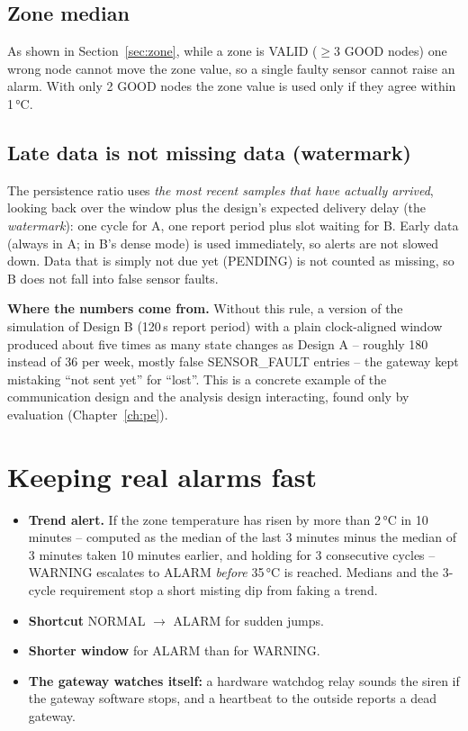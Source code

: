 \documentclass[11pt,a4paper]{report}
\newcommand{\why}[1]{\par\noindent\colorbox{gray!10}{\parbox{\dimexpr\linewidth-2\fboxsep}{\small\textbf{Where the numbers come from.} #1}}\par}
\begin{document}
\subsection{Zone median}
As shown in Section~\ref{sec:zone}, while a zone is VALID ($\geq 3$ GOOD nodes) one wrong node cannot move the zone value, so a single faulty sensor cannot raise an alarm. With only 2 GOOD nodes the zone value is used only if they agree within 1\,°C.

\subsection{Late data is not missing data (watermark)}
The persistence ratio uses \emph{the most recent samples that have actually arrived}, looking back over the window plus the design's expected delivery delay (the \emph{watermark}): one cycle for A, one report period plus slot waiting for B. Early data (always in A; in B's dense mode) is used immediately, so alerts are not slowed down. Data that is simply not due yet (PENDING) is not counted as missing, so B does not fall into false sensor faults.

\why{Without this rule, a version of the simulation of Design B (120\,s report period) with a plain clock-aligned window produced about five times as many state changes as Design A -- roughly 180 instead of 36 per week, mostly false SENSOR\_FAULT entries -- the gateway kept mistaking ``not sent yet'' for ``lost''. This is a concrete example of the communication design and the analysis design interacting, found only by evaluation (Chapter~\ref{ch:pe}).}

\section{Keeping real alarms fast}\label{sec:trend}
\begin{itemize}
  \item \textbf{Trend alert.} If the zone temperature has risen by more than 2\,°C in 10 minutes -- computed as the median of the last 3 minutes minus the median of 3 minutes taken 10 minutes earlier, and holding for 3 consecutive cycles -- WARNING escalates to ALARM \emph{before} 35\,°C is reached. Medians and the 3-cycle requirement stop a short misting dip from faking a trend.
  \item \textbf{Shortcut} NORMAL $\to$ ALARM for sudden jumps.
  \item \textbf{Shorter window} for ALARM than for WARNING.
  \item \textbf{The gateway watches itself:} a hardware watchdog relay sounds the siren if the gateway software stops, and a heartbeat to the outside reports a dead gateway.
\end{itemize}
\end{document}

